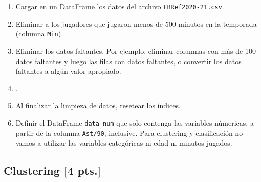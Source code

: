 \documentclass[a4paper,11pt]{article}
\theoremstyle{definition}
\begin{document}
\begin{enumerate}
\item Cargar en un DataFrame los datos del archivo \lstinline{FBRef2020-21.csv}.
\item Eliminar a los jugadores que jugaron menos de 500 minutos en la temporada (columna \lstinline{Min}).
\item Eliminar los datos faltantes. Por ejemplo, eliminar columnas con más de 100 datos faltantes y luego las filas con datos faltantes, o convertir los datos faltantes a algún valor apropiado.
\item .%
\item Al finalizar la limpieza de datos, resetear los índices.
\item Definir el DataFrame \lstinline{data_num} que solo contenga las variables númericas, a partir de la columna
\lstinline{Ast/90}, inclusive.
Para clustering y clasificación no vamos a utilizar las variables categóricas ni edad ni minutos jugados.
\end{enumerate}

\subsection*{Clustering [4 pts.]}
\end{document}
